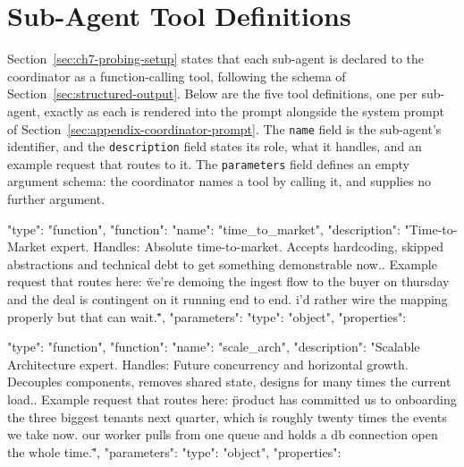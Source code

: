 
\section{Sub-Agent Tool Definitions}
\label{sec:appendix-subagent-tools}

Section~\ref{sec:ch7-probing-setup} states that each sub-agent is declared to the coordinator as a function-calling tool, following the schema of Section~\ref{sec:structured-output}. Below are the five tool definitions, one per sub-agent, exactly as each is rendered into the prompt alongside the system prompt of Section~\ref{sec:appendix-coordinator-prompt}. The \texttt{name} field is the sub-agent's identifier, and the \texttt{description} field states its role, what it handles, and an example request that routes to it. The \texttt{parameters} field defines an empty argument schema: the coordinator names a tool by calling it, and supplies no further argument.

\begin{promptverbatim}
{
  "type": "function",
  "function": {
    "name": "time_to_market",
    "description": "Time-to-Market expert. Handles: Absolute time-to-market. Accepts hardcoding, skipped abstractions and technical debt to get something demonstrable now.. Example request that routes here: \"we're demoing the ingest flow to the buyer on thursday and the deal is contingent on it running end to end. i'd rather wire the mapping properly but that can wait.\"",
    "parameters": {
      "type": "object",
      "properties": {}
    }
  }
}
\end{promptverbatim}

\begin{promptverbatim}
{
  "type": "function",
  "function": {
    "name": "scale_arch",
    "description": "Scalable Architecture expert. Handles: Future concurrency and horizontal growth. Decouples components, removes shared state, designs for many times the current load.. Example request that routes here: \"product has committed us to onboarding the three biggest tenants next quarter, which is roughly twenty times the events we take now. our worker pulls from one queue and holds a db connection open the whole time.\"",
    "parameters": {
      "type": "object",
      "properties": {}
    }
  }
}
\end{promptverbatim}

